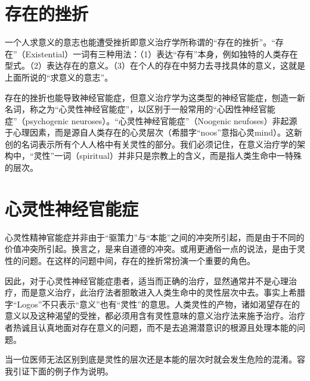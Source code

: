 \documentclass[11pt,oneside]{book}
\begin{document}
\begin{common-format}
\section{存在的挫折}
一个人求意义的意志也能遭受挫折即意义治疗学所称谓的“存在的挫折”。“存在”（Existential）一词有三种用法：（1）表达“存有”本身，例如独特的人类存在型式。（2）表达存在的意义。（3）在个人的存在中努力去寻找具体的意义，这就是上面所说的“求意义的意志”。

存在的挫折也能导致神经官能症，但意义治疗学为这类型的神经官能症，刨造一新名词，称之为“心灵性神经官能症”，以区别于一般常用的“心因性神经官能症”（psychogenic neuroses）。“心灵性神经官能症”（Noogenic neufoses）非起源于心理因素，而是源自人类存在的心灵层次（希腊字“noos”意指心灵mind）。这新创的名词表示所有个人人格中有关灵性的部分。我们必须记住，在意义治疗学的架构中，“灵性”一词（spiritual）并非只是宗教上的含义，而是指人类生命中一特殊的层次。


\section{心灵性神经官能症}
心灵性精神官能症并非由于“驱策力”与“本能”之间的冲突所引起，而是由于不同的价值冲突所引起。换言之，是来自道德的冲突。或用更通俗一点的说法，是由于灵性的问题。在这样的问题中间，存在的挫折常扮演一个重要的角色。

因此，对于心灵性神经官能症患者，适当而正确的治疗，显然通常并不是心理治疗，而是意义治疗，此治疗法者胆敢进入人类生命中的灵性层次中去。事实上希腊字“Logos”不只表示“意义”也有“灵性”的意思。人类灵性的产物，诸如渴望存在的意义以及这种渴望的受挫，都必须用含有灵性意味的意义治疗法来施予治疗。治疗者热诚且认真地面对存在意义的问题，而不是去追溯潜意识的根源且处理本能的问题。

当一位医师无法区别到底是灵性的层次还是本能的层次时就会发生危险的混淆。容我引证下面的例子作为说明。


\end{common-format}
\end{document}
